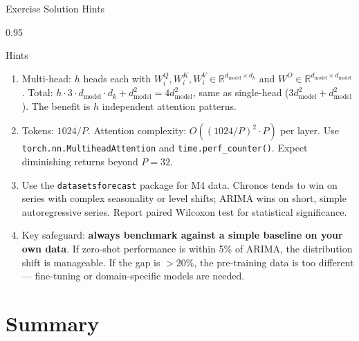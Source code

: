 \documentclass[9pt, aspectratio=169, t]{beamer}
\begin{document}
\begin{frame}{Exercise Solution Hints}
    \begin{cminipage}{0.95\textwidth}
    \vspace{-0.3cm}
    {\footnotesize
    \begin{block}{Hints}
        \begin{enumerate}\setlength{\itemsep}{1pt}
            \item Multi-head: $h$ heads each with $W^Q_i, W^K_i, W^V_i \in \mathbb{R}^{d_{\text{model}} \times d_k}$ and $W^O \in \mathbb{R}^{d_{\text{model}} \times d_{\text{model}}}$. Total: $h \cdot 3 \cdot d_{\text{model}} \cdot d_k + d_{\text{model}}^2 = 4d_{\text{model}}^2$, same as single-head ($3d_{\text{model}}^2 + d_{\text{model}}^2$). The benefit is $h$ independent attention patterns.

            \item Tokens: $1024/P$. Attention complexity: $O((1024/P)^2 \cdot P)$ per layer. Use \texttt{torch.nn.MultiheadAttention} and \texttt{time.perf\_counter()}. Expect diminishing returns beyond $P = 32$.

            \item Use the \texttt{datasetsforecast} package for M4 data. Chronos tends to win on series with complex seasonality or level shifts; ARIMA wins on short, simple autoregressive series. Report paired Wilcoxon test for statistical significance.

            \item Key safeguard: \textbf{always benchmark against a simple baseline on your own data}. If zero-shot performance is within 5\% of ARIMA, the distribution shift is manageable. If the gap is $> 20\%$, the pre-training data is too different --- fine-tuning or domain-specific models are needed.
        \end{enumerate}
    \end{block}
    }
    \end{cminipage}
\end{frame}

\section{Summary}
\end{document}
